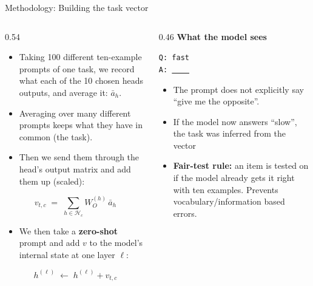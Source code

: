 \documentclass[aspectratio=169,11pt]{beamer}
\newcommand{\tight}{\setlength{\itemsep}{2pt plus 1pt minus 1pt}}
\begin{document}
\begin{frame}{Methodology: Building the task vector}
  \begin{columns}[T]
    \begin{column}{0.54\textwidth}
      \begin{itemize}\footnotesize\tight
        \item Taking 100 different ten-example prompts of one task, we record what
              each of the 10 chosen heads outputs, and average it: $\bar a_h$.
        \item Averaging over many different prompts keeps what they have in
              common (the task).
        \item Then we send them through the head's output matrix and add them up (scaled):
      \end{itemize}
      \vspace{-2mm}
      \begin{equation*}
        v_{t,c} \;=\; \sum_{h \in \mathcal{H}_c} W_O^{(h)}\, \bar a_h
      \end{equation*}
      \begin{itemize}\footnotesize\tight
        \item We then take a \textbf{zero-shot} prompt and
              add $v$ to the model's internal state at one layer $\ell$:
      \end{itemize}
      \vspace{-2mm}
      \begin{equation*}
        h^{(\ell)} \;\leftarrow\; h^{(\ell)} + v_{t,c}
      \end{equation*}
    \end{column}
    \begin{column}{0.46\textwidth}
      \vspace{1mm}
      \textbf{What the model sees}
      \vspace{1mm}

      {\footnotesize\texttt{Q: fast \\ A: \underline{\ \ \ \ }}}
      \vspace{1.5mm}
      \begin{itemize}\footnotesize\tight
        \item The prompt does not explicitly say ``give me the
              opposite''.
        \item If the model now answers ``slow'', the task was inferred from the vector
      \end{itemize}
      \vspace{1mm}
      \begin{itemize}\footnotesize\tight
        \item \textbf{Fair-test rule:} an item is tested on if the model already
              gets it right with ten examples. Prevents vocabulary/information based errors.
      \end{itemize}
    \end{column}
  \end{columns}
\end{frame}
\end{document}
